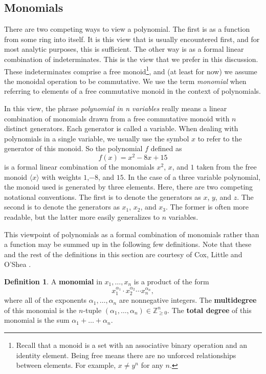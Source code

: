 \documentclass[MS, xcolor=dvipsnames]{wfuthesis}
\def\bZ{\mathbb{Z}}
\theoremstyle{definition}
\newtheorem{definition}[theorem]{Definition}
\begin{document}

\subsection{Monomials}
There are two competing ways to view a polynomial. The first is as a function from some ring into itself. It is this view that is usually encountered first, and for most analytic purposes, this is sufficient. The other way is as a formal linear combination of indeterminates. This is the view that we prefer in this discussion. These indeterminates comprise a free monoid\footnote{Recall that a monoid is a set with an associative binary operation and an identity element. Being free means there are no unforced relationships between elements. For example, $x \ne y^n$ for any $n$.}, and (at least for now) we assume the monoidal operation to be commutative. We use the term \textit{monomial} when referring to elements of a free commutative monoid in the context of polynomials. \par
In this view, the phrase \textit{polynomial in n variables} really means a linear combination of monomials drawn from a free commutative monoid with $n$ distinct generators. Each generator is called a variable. When dealing with polynomials in a single variable, we usually use the symbol $x$ to refer to the generator of this monoid. So the polynomial $f$ defined as
\[ f(x) = x^2-8x+15 \]
is a formal linear combination of the monomials $x^2$, $x$, and $1$ taken from the free monoid $\langle x \rangle$ with weights $1$,$-8$, and $15$. In the case of a three variable polynomial, the monoid used is generated by three elements. Here, there are two competing notational conventions. The first is to denote the generators as $x$, $y$, and $z$. The second is to denote the generators as $x_1$, $x_2$, and $x_3$. The former is often more readable, but the latter more easily generalizes to $n$ variables. \par
This viewpoint of polynomials as a formal combination of monomials rather than a function may be summed up in the following few definitions. Note that these and the rest of the definitions in this section are courtesy of Cox, Little and O'Shea \cite{Cox2015}.
\begin{definition}
  A \textbf{monomial} in $x_1,\dots,x_n$ is a product of the form
  \[ x_1^{\alpha_1} \cdot x_2^{\alpha_2} \cdots x_n^{\alpha_n}, \]
  where all of the exponents $\alpha_1,\dots,\alpha_n$ are nonnegative integers. The \textbf{multidegree} of this monomial is the $n$-tuple $(\alpha_1,\dots,\alpha_n) \in \bZ_{\ge0}^n$. The \textbf{total degree} of this monomial is the sum $\alpha_1 + \dots + \alpha_n$.
\end{definition}
\end{document}
